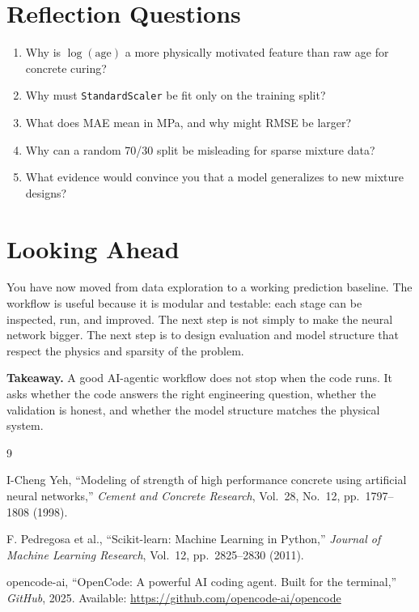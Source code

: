 \documentclass[11pt]{article}
\begin{document}
\section{Reflection Questions}
\label{sec:reflection}

\begin{enumerate}
  \item Why is $\log(\text{age})$ a more physically motivated feature than raw age for concrete curing?
  \item Why must \texttt{StandardScaler} be fit only on the training split?
  \item What does MAE mean in MPa, and why might RMSE be larger?
  \item Why can a random 70/30 split be misleading for sparse mixture data?
  \item What evidence would convince you that a model generalizes to new mixture designs?
\end{enumerate}

\section{Looking Ahead}
\label{sec:looking-ahead}

You have now moved from data exploration to a working prediction baseline.  The workflow is useful because it is modular and testable: each stage can be inspected, run, and improved.  The next step is not simply to make the neural network bigger.  The next step is to design evaluation and model structure that respect the physics and sparsity of the problem.

\begin{def-box}
\textbf{Takeaway.}  A good AI-agentic workflow does not stop when the code runs.  It asks whether the code answers the right engineering question, whether the validation is honest, and whether the model structure matches the physical system.
\end{def-box}


\begin{thebibliography}{9}

I-Cheng Yeh, ``Modeling of strength of high performance concrete using artificial neural networks,'' \emph{Cement and Concrete Research}, Vol.~28, No.~12, pp.~1797--1808 (1998).

F. Pedregosa et al., ``Scikit-learn: Machine Learning in Python,'' \emph{Journal of Machine Learning Research}, Vol.~12, pp.~2825--2830 (2011).

opencode-ai, ``OpenCode: A powerful AI coding agent. Built for the terminal,'' \emph{GitHub}, 2025. Available: \url{https://github.com/opencode-ai/opencode}

\end{thebibliography}
\end{document}
